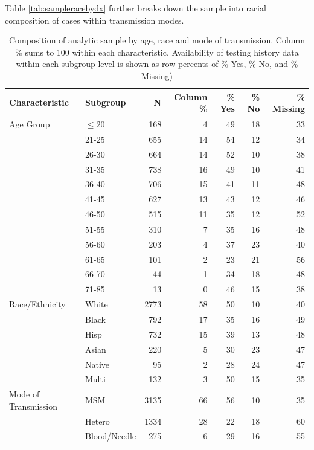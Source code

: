 \documentclass{article}\usepackage[]{graphicx}\usepackage[]{color}
\begin{document}
Table \ref{tab:sampleracebydx} further breaks down the sample into racial composition of cases within transmission modes. 


\begin{table}[!h]
\centering
\caption{Composition of analytic sample by age, race and mode of transmission. Column \% sums to 100 within each characteristic. Availability of testing history data within each subgroup level is shown as row percents of \% Yes, \% No, and \% Missing)} 
\label{tab:sample}
{\small
\begin{tabular}{llrrrrr}
  \hline
Characteristic & Subgroup & N & Column \%  &  \% Yes &  \% No &  \% Missing \\ 
  \hline
Age Group & $\leq$20 & 168 & 4 & 49 & 18 & 33 \\ 
   & 21-25 & 655 & 14 & 54 & 12 & 34 \\ 
   & 26-30 & 664 & 14 & 52 & 10 & 38 \\ 
   & 31-35 & 738 & 16 & 49 & 10 & 41 \\ 
   & 36-40 & 706 & 15 & 41 & 11 & 48 \\ 
   & 41-45 & 627 & 13 & 43 & 12 & 46 \\ 
   & 46-50 & 515 & 11 & 35 & 12 & 52 \\ 
   & 51-55 & 310 & 7 & 35 & 16 & 48 \\ 
   & 56-60 & 203 & 4 & 37 & 23 & 40 \\ 
   & 61-65 & 101 & 2 & 23 & 21 & 56 \\ 
   & 66-70 & 44 & 1 & 34 & 18 & 48 \\ 
   & 71-85 & 13 & 0 & 46 & 15 & 38 \\ 
  Race/Ethnicity & White & 2773 & 58 & 50 & 10 & 40 \\ 
   & Black & 792 & 17 & 35 & 16 & 49 \\ 
   & Hisp & 732 & 15 & 39 & 13 & 48 \\ 
   & Asian & 220 & 5 & 30 & 23 & 47 \\ 
   & Native & 95 & 2 & 28 & 24 & 47 \\ 
   & Multi & 132 & 3 & 50 & 15 & 35 \\ 
  Mode of Transmission & MSM & 3135 & 66 & 56 & 10 & 35 \\ 
   & Hetero & 1334 & 28 & 22 & 18 & 60 \\ 
   & Blood/Needle & 275 & 6 & 29 & 16 & 55 \\ 
   \hline
\end{tabular}
}
\end{table}
\end{document}
